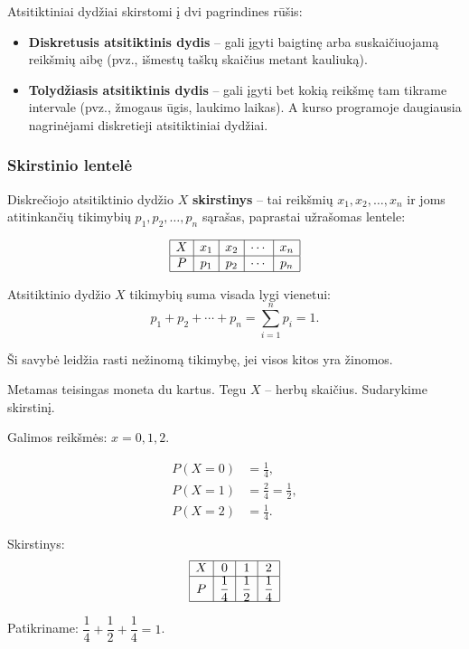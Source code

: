 Atsitiktiniai dydžiai skirstomi į dvi pagrindines rūšis:

\begin{itemize}
  \item \textbf{Diskretusis atsitiktinis dydis} – gali įgyti baigtinę arba suskaičiuojamą reikšmių aibę (pvz., išmestų taškų skaičius metant kauliuką).
  \item \textbf{Tolydžiasis atsitiktinis dydis} – gali įgyti bet kokią reikšmę tam tikrame intervale (pvz., žmogaus ūgis, laukimo laikas). A kurso programoje daugiausia nagrinėjami diskretieji atsitiktiniai dydžiai.
\end{itemize}

\subsubsection*{Skirstinio lentelė}

Diskrečiojo atsitiktinio dydžio $X$ \textbf{skirstinys} – tai reikšmių $x_1, x_2, \ldots, x_n$ ir joms atitinkančių tikimybių $p_1, p_2, \ldots, p_n$ sąrašas, paprastai užrašomas lentele:

\[
\begin{array}{|c|c|c|c|c|}
\hline
X & x_1 & x_2 & \cdots & x_n \\
\hline
P & p_1 & p_2 & \cdots & p_n \\
\hline
\end{array}
\]

\begin{theorem}
Atsitiktinio dydžio $X$ tikimybių suma visada lygi vienetui:
\[
p_1 + p_2 + \cdots + p_n = \sum_{i=1}^{n} p_i = 1.
\]
\end{theorem}

Ši savybė leidžia rasti nežinomą tikimybę, jei visos kitos yra žinomos.

\begin{example}
Metamas teisingas moneta du kartus. Tegu $X$ – herbų skaičius. Sudarykime skirstinį.

\medskip
Galimos reikšmės: $x = 0, 1, 2$.

\begin{align*}
P(X = 0) &= \frac{1}{4}, \\
P(X = 1) &= \frac{2}{4} = \frac{1}{2}, \\
P(X = 2) &= \frac{1}{4}.
\end{align*}

Skirstinys:
\[
\begin{array}{|c|c|c|c|}
\hline
X & 0 & 1 & 2 \\
\hline
P & \dfrac{1}{4} & \dfrac{1}{2} & \dfrac{1}{4} \\
\hline
\end{array}
\]

Patikriname: $\dfrac{1}{4} + \dfrac{1}{2} + \dfrac{1}{4} = 1$. \checkmark
\end{example}

